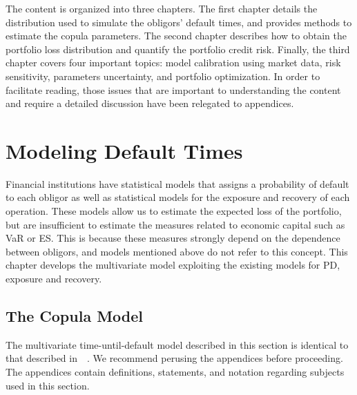 \documentclass[11pt,fleqn]{book} %
\begin{document}
The content is organized into three chapters. The first chapter details the 
distribution used to simulate the obligors' default times, and provides methods 
to estimate the copula parameters. The second chapter describes how to obtain 
the portfolio loss distribution and quantify the portfolio credit risk.
Finally, the third chapter covers four important topics: model calibration using
market data, risk sensitivity, parameters uncertainty, and portfolio optimization. 
In order to facilitate reading, those issues that are important to understanding 
the content and require a detailed discussion have been relegated to appendices.


\chapter{Modeling Default Times}
\label{chap:mdt}

Financial institutions have statistical models that assigns a probability of 
default to each obligor as well as statistical models for the exposure and 
recovery of each operation. These models allow us to estimate the expected 
loss of the portfolio, but are insufficient to estimate the measures related 
to economic capital such as VaR or ES. This is because these measures strongly 
depend on the dependence between obligors, and models mentioned above do not 
refer to this concept. This chapter develops the multivariate model exploiting 
the existing models for PD, exposure and recovery.

\section{The Copula Model}

The multivariate time-until-default model described in this section is identical
to that described in~\cite{li:2000,frey:2001}~\cite[chap. 2.6]{bluhm:2002}.
We recommend perusing the appendices before proceeding. The appendices contain 
definitions, statements, and notation regarding subjects used in this section.
\end{document}
